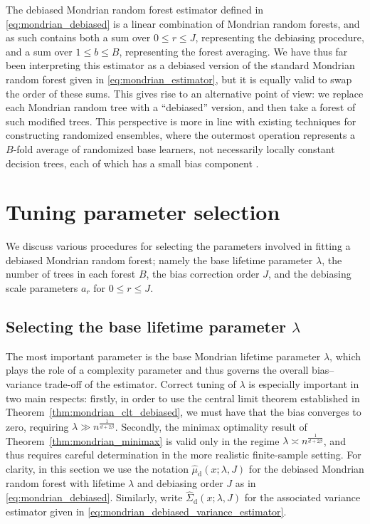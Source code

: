 \documentclass[11pt,lof]{puthesis}
\newcommand{\rd}{\ensuremath{\mathrm{d}}}
\theoremstyle{break}
\theoremstyle{proof}
\begin{document}
The debiased Mondrian random forest estimator defined in
\eqref{eq:mondrian_debiased} is
a linear combination of Mondrian random forests, and as such contains both a
sum over $0 \leq r \leq J$, representing the debiasing procedure, and a sum
over $1 \leq b \leq B$, representing the forest averaging. We have thus far
been interpreting this estimator as a debiased version of the standard Mondrian
random forest given in \eqref{eq:mondrian_estimator}, but it is
equally valid to swap the order of these sums. This gives rise to an
alternative point of view: we replace each Mondrian random tree with a
``debiased'' version, and then take a forest of such modified trees. This
perspective is more in line with existing techniques for constructing
randomized ensembles, where the outermost operation represents a $B$-fold
average of randomized base learners, not necessarily locally constant decision
trees, each of which has a small bias component \citep{caruana2004ensemble,
zhou2019deep, friedberg2020local}.

\section{Tuning parameter selection}%
\label{sec:mondrian_parameter_selection}

We discuss various procedures for selecting the parameters involved in fitting
a debiased Mondrian random forest; namely the base lifetime parameter
$\lambda$, the number of trees in each forest $B$, the bias correction order
$J$, and the debiasing scale parameters $a_r$ for $0 \leq r \leq J$.

\subsection{Selecting the base lifetime parameter
\texorpdfstring{$\lambda$}{lambda}}%
\label{sec:mondrian_lifetime_selection}

The most important parameter is the base Mondrian lifetime parameter $\lambda$,
which plays the role of a complexity parameter and thus governs the overall
bias--variance trade-off of the estimator. Correct tuning of $\lambda$ is
especially important in two main respects:
%
firstly, in order to use the central limit theorem established in
Theorem~\ref{thm:mondrian_clt_debiased}, we must have that the bias converges
to zero,
requiring $\lambda \gg n^{\frac{1}{d + 2\beta}}$.
%
Secondly, the minimax optimality result of Theorem~\ref{thm:mondrian_minimax}
is valid only in the regime $\lambda \asymp n^{\frac{1}{d + 2\beta}}$, and thus
requires careful determination in the more realistic finite-sample setting. For
clarity, in this section we use the notation $\hat\mu_\rd(x; \lambda, J)$ for
the debiased Mondrian random forest with lifetime $\lambda$ and debiasing order
$J$ as in \eqref{eq:mondrian_debiased}.
Similarly, write $\hat\Sigma_\rd(x; \lambda, J)$ for the associated
variance estimator given in \eqref{eq:mondrian_debiased_variance_estimator}.
\end{document}
